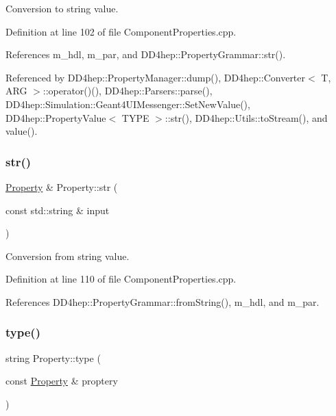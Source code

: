 Conversion to string value. 



Definition at line 102 of file Component\+Properties.\+cpp.



References m\+\_\+hdl, m\+\_\+par, and D\+D4hep\+::\+Property\+Grammar\+::str().



Referenced by D\+D4hep\+::\+Property\+Manager\+::dump(), D\+D4hep\+::\+Converter$<$ T, A\+R\+G $>$\+::operator()(), D\+D4hep\+::\+Parsers\+::parse(), D\+D4hep\+::\+Simulation\+::\+Geant4\+U\+I\+Messenger\+::\+Set\+New\+Value(), D\+D4hep\+::\+Property\+Value$<$ T\+Y\+P\+E $>$\+::str(), D\+D4hep\+::\+Utils\+::to\+Stream(), and value().

\hypertarget{class_d_d4hep_1_1_property_a4f4d25269959d15fb6b6c9cf581ee2a4}{}\label{class_d_d4hep_1_1_property_a4f4d25269959d15fb6b6c9cf581ee2a4} 
\subsubsection{\texorpdfstring{str()}{str()}\hspace{0.1cm}{\footnotesize\ttfamily [2/2]}}
{\footnotesize\ttfamily \hyperlink{class_d_d4hep_1_1_property}{Property} \& Property\+::str (\begin{DoxyParamCaption}\item[{const std\+::string \&}]{input }\end{DoxyParamCaption})}



Conversion from string value. 



Definition at line 110 of file Component\+Properties.\+cpp.



References D\+D4hep\+::\+Property\+Grammar\+::from\+String(), m\+\_\+hdl, and m\+\_\+par.

\hypertarget{class_d_d4hep_1_1_property_a77de012a4b602cc74b395050128d289c}{}\label{class_d_d4hep_1_1_property_a77de012a4b602cc74b395050128d289c} 
\subsubsection{\texorpdfstring{type()}{type()}\hspace{0.1cm}{\footnotesize\ttfamily [1/3]}}
{\footnotesize\ttfamily string Property\+::type (\begin{DoxyParamCaption}\item[{const \hyperlink{class_d_d4hep_1_1_property}{Property} \&}]{proptery }\end{DoxyParamCaption})\hspace{0.3cm}{\ttfamily [static]}}



